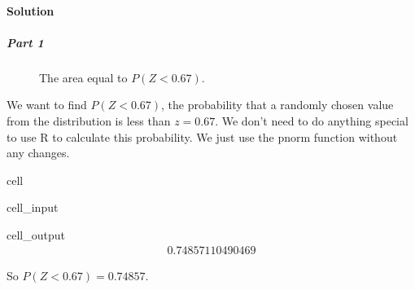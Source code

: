 \documentclass[letterpaper,10pt,english]{jupyterBook}
\begin{document}
\paragraph{Solution}
\label{\detokenize{Ch4 The Normal Distribution and the Central Limit Theorem/4.2 The Standard Normal Distribution:id2}}

\subparagraph{Part 1}
\label{\detokenize{Ch4 The Normal Distribution and the Central Limit Theorem/4.2 The Standard Normal Distribution:id3}}
\begin{figure}[htbp]
\centering
\capstart

\noindent{}
\caption{The area equal to \(P(Z < 0.67)\).}\label{\detokenize{Ch4 The Normal Distribution and the Central Limit Theorem/4.2 The Standard Normal Distribution:stdnormal-ex2}}\end{figure}

\sphinxAtStartPar
We want to find \(P(Z < 0.67)\), the probability that a randomly chosen value from the distribution is less than \(z = 0.67\). We don’t need to do anything special to use R to calculate this probability. We just use the pnorm function without any changes.

\begin{sphinxuseclass}{cell}\begin{sphinxVerbatimInput}

\begin{sphinxuseclass}{cell_input}
\begin{sphinxVerbatim}[commandchars=\\\{\}]
\end{sphinxVerbatim}

\end{sphinxuseclass}\end{sphinxVerbatimInput}
\begin{sphinxVerbatimOutput}

\begin{sphinxuseclass}{cell_output}\begin{equation*}
\begin{split}0.74857110490469\end{split}
\end{equation*}
\end{sphinxuseclass}\end{sphinxVerbatimOutput}

\end{sphinxuseclass}
\sphinxAtStartPar
So \(P(Z < 0.67) = 0.74857\).
\end{document}
